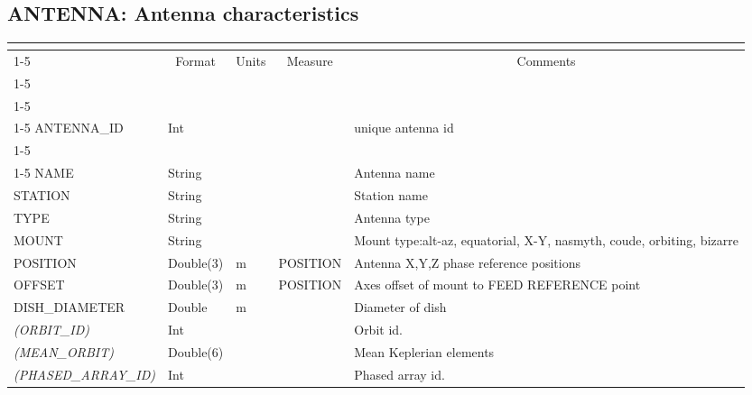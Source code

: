 \documentclass{article}
\newcommand{\defline}[1]{\cline{1-5}
\multicolumn{5}{|l|}{#1} \\
\cline{1-5}}
\newcommand{\definetable}[3][]
{
  \vfill\newpage
  \subsection{#2}
  \label{tbl:#1}
  \vspace{0.15in}
  \small
  \begin{tabular}{|l|p{1.25in}|l|p{.9in}|p{1.4in}|}
  \hline
  \multicolumn{5}{|c|}{\bf #1}\\
  \cline{1-5}
  \multicolumn{1}{|c|}{Name}&\multicolumn{1}{|c|}{Format}&
  \multicolumn{1}{|c|}{Units}&\multicolumn{1}{|c|}{Measure}&
  \multicolumn{1}{|c|}{Comments}\\
  \cline{1-5}
  #3
  \hline
  \end{tabular}
}
\begin{document}
\definetable{ANTENNA: Antenna characteristics}
{
\defline{\bf Columns}
\defline{\bf Keys}
ANTENNA\_ID &  Int &  &  &  unique antenna id \\
\defline{\em Data}
NAME &       String &  & &  Antenna name \\
STATION &        String & & &  Station name \\
TYPE  &  String &     &      & Antenna type \\
MOUNT  & String &  & &   Mount type:alt-az, equatorial, X-Y, nasmyth, coude, orbiting, bizarre \\
POSITION &   Double(3) &  m   &     POSITION &   Antenna X,Y,Z phase reference positions \\
OFFSET & Double(3)  &   m &     POSITION & Axes offset of mount to FEED REFERENCE point \\
DISH\_DIAMETER &  Double &  m  &      & Diameter of dish\\
{\it (ORBIT\_ID)}    &    Int & & &  Orbit id. \\
{\it (MEAN\_ORBIT)}  &    Double(6) & & & Mean Keplerian elements\\
{\it (PHASED\_ARRAY\_ID)} & Int   &  & &   Phased array id.\\
}
\end{document}
